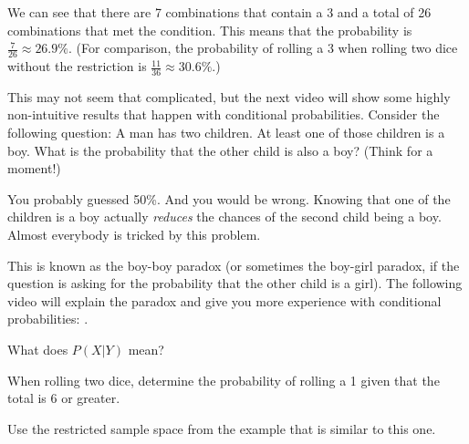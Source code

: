 \documentclass{ximera}
\begin{document}
We can see that there are 7 combinations that contain a 3 and a total of 26 combinations that met the condition. This means that the probability is $\frac{7}{26} \approx 26.9\%$. (For comparison, the probability of rolling a 3 when rolling two dice without the restriction is $\frac{11}{36} \approx 30.6\%$.)

This may not seem that complicated, but the next video will show some highly non-intuitive results that happen with conditional probabilities. Consider the following question: A man has two children. At least one of those children is a boy. What is the probability that the other child is also a boy? (Think for a moment!)

You probably guessed 50\%. And you would be wrong. Knowing that one of the children is a boy actually \emph{reduces} the chances of the second child being a boy. Almost everybody is tricked by this problem.

This is known as the boy-boy paradox (or sometimes the boy-girl paradox, if the question is asking for the probability that the other child is a girl). The following video will explain the paradox and give you more experience with conditional probabilities: .

\begin{question}
What does $P(X|Y)$ mean?

    \begin{multipleChoice}
    \end{multipleChoice}

\end{question}

\begin{question}
When rolling two dice, determine the probability of rolling a 1 given that the total is 6 or greater.

    \begin{multipleChoice}
    \end{multipleChoice}
    \begin{hint}
      Use the restricted sample space from the example that is similar to this one.
    \end{hint}

\end{question}
\end{document}
